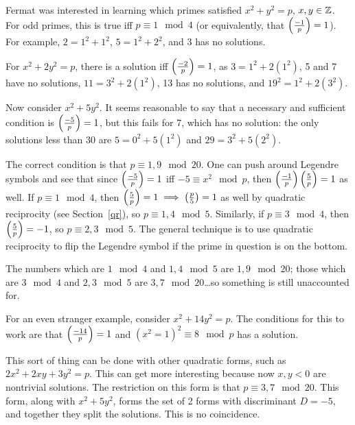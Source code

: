 Fermat was interested in learning which primes satisfied $x^2+y^2 = p$, $x,y\in\mathbb{Z}$. For odd primes, this is true iff $p \equiv 1\mod 4$ (or equivalently, that $\left(\frac{-1}{p}\right) = 1$). For example, $2 = 1^2+1^2$, $5 = 1^2+2^2$, and 3 has no solutions.

\label{use}
For $x^2 + 2y^2 = p$, there is a solution iff $\left(\frac{-2}{p}\right) = 1$, as $3 = 1^2 + 2(1^2)$, 5 and 7 have no solutions, $11 = 3^2 + 2(1^2)$, 13 has no solutions, and $19^2 = 1^2 + 2(3^2)$.

Now consider $x^2+5y^2$. It seems reasonable to say that a necessary and sufficient condition is $\left(\frac{-5}{p}\right) = 1$, but this fails for 7, which has no solution: the only solutions less than 30 are $5 = 0^2 + 5(1^2)$ and $29 = 3^2 + 5(2^2)$.

The correct condition is that $p \equiv 1,9\mod 20$. One can push around Legendre symbols and see that since $\left(\frac{-5}{p}\right) = 1$ iff $-5 \equiv x^2\mod p$, then $\left(\frac{-1}{p}\right)\left(\frac{5}{p}\right) = 1$ as well. If $p\equiv 1\mod 4$, then $\left(\frac{5}{p}\right) = 1 \implies \left(\frac{p}{5}\right) = 1$ as well by quadratic reciprocity (see Section~\ref{qr}), so $p \equiv 1,4\mod 5$. Similarly, if $p\equiv 3\mod 4$, then $\left(\frac{5}{p}\right) = -1$, so $p\equiv 2,3\mod 5$. The general technique is to use quadratic reciprocity to flip the Legendre symbol if the prime in question is on the bottom.

The numbers which are $1\mod 4$ and $1,4\mod 5$ are $1,9\mod 20$; those which are $3\mod 4$ and $2,3\mod 5$ are $3,7\mod 20$\dots so something is still unaccounted for.

For an even stranger example, consider $x^2+14y^2 = p$. The conditions for this to work are that $\left(\frac{-14}{p}\right) = 1$ and $(x^2=1)^2 \equiv 8\mod p$ has a solution.

This sort of thing can be done with other quadratic forms, such as $2x^2+2xy+3y^2 = p$. This can get more interesting because now $x,y<0$ are nontrivial solutions. The restriction on this form is that $p \equiv 3,7\mod 20$. This form, along with $x^2 +5y^2$, forms the set of 2 forms with discriminant $D = -5$, and together they split the solutions. This is no coincidence.

